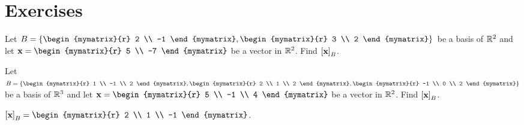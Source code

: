 \section*{Exercises}

\begin{ex}
  Let $B = \set{\begin{mymatrix}{r} 2 \\ -1 \end{mymatrix},
    \begin{mymatrix}{r} 3 \\ 2 \end{mymatrix} }$ be a basis of $\mathbb{R}^2$
  and let $\vect{x} = \begin{mymatrix}{r} 5 \\ -7 \end{mymatrix}$ be a
  vector in $\mathbb{R}^2$. Find $\left[\mbox{\bf x}\right]_B$.
\end{ex}

\begin{ex}
  Let $B = \set{\begin{mymatrix}{r} 1 \\ -1 \\ 2 \end{mymatrix},
    \begin{mymatrix}{r} 2 \\ 1 \\ 2 \end{mymatrix},
    \begin{mymatrix}{r} -1 \\ 0 \\ 2 \end{mymatrix}}$ be a basis of
  $\mathbb{R}^3$ and let
  $\vect{x} = \begin{mymatrix}{r} 5 \\ -1 \\ 4 \end{mymatrix}$ be a
  vector in $\mathbb{R}^2$. Find $\left[\mbox{\bf x}\right]_B$.
  \begin{sol}
    $\coord{\vect{x}}_B
    = \begin{mymatrix}{r} 2 \\ 1 \\ -1 \end{mymatrix}$.
  \end{sol}
\end{ex}

